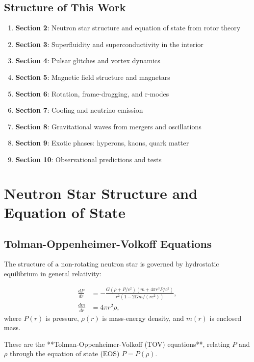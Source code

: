\documentclass[12pt,a4paper]{article}
\theoremstyle{definition}
\theoremstyle{remark}
\begin{document}
\subsection{Structure of This Work}

\begin{enumerate}
\item \textbf{Section 2}: Neutron star structure and equation of state from rotor theory
\item \textbf{Section 3}: Superfluidity and superconductivity in the interior
\item \textbf{Section 4}: Pulsar glitches and vortex dynamics
\item \textbf{Section 5}: Magnetic field structure and magnetars
\item \textbf{Section 6}: Rotation, frame-dragging, and r-modes
\item \textbf{Section 7}: Cooling and neutrino emission
\item \textbf{Section 8}: Gravitational waves from mergers and oscillations
\item \textbf{Section 9}: Exotic phases: hyperons, kaons, quark matter
\item \textbf{Section 10}: Observational predictions and tests
\end{enumerate}

\section{Neutron Star Structure and Equation of State}

\subsection{Tolman-Oppenheimer-Volkoff Equations}

The structure of a non-rotating neutron star is governed by hydrostatic equilibrium in general relativity:

\begin{align}
\frac{dP}{dr} &= -\frac{G(\rho + P/c^2)(m + 4\pi r^3 P/c^2)}{r^2(1 - 2Gm/(rc^2))}, \\
\frac{dm}{dr} &= 4\pi r^2 \rho,
\end{align}
where $P(r)$ is pressure, $\rho(r)$ is mass-energy density, and $m(r)$ is enclosed mass.

These are the **Tolman-Oppenheimer-Volkoff (TOV) equations**, relating $P$ and $\rho$ through the equation of state (EOS) $P = P(\rho)$.
\end{document}
